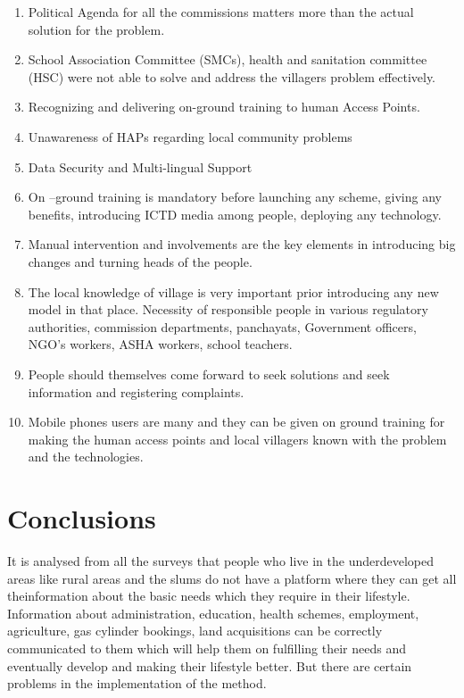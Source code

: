 \begin{enumerate}
\item Political Agenda for all the commissions matters more than the actual solution for the problem.
\item School Association Committee (SMCs), health and sanitation committee (HSC) were not able to solve and address the villagers problem effectively.
\item Recognizing and delivering on-ground training to human Access Points.
\item Unawareness of HAPs regarding local community problems
\item Data Security and Multi-lingual Support
\item On –ground training is mandatory before launching any scheme, giving any
benefits, introducing ICTD media among people, deploying any technology.
\item Manual intervention and involvements are the key elements in introducing
big changes and turning heads of the people.
\item The local knowledge of village is very important prior introducing any new
model in that place.
Necessity of responsible people in various regulatory authorities, commission
departments, panchayats, Government officers, NGO’s workers, ASHA
workers, school teachers.
\item People should themselves come forward to seek solutions and seek
information and registering complaints.
\item Mobile phones users are many and they can be given on ground training for
making the human access points and local villagers known with the problem
and the technologies.
\end{enumerate}

\section {Conclusions}
It is analysed from all the surveys that people who live in the underdeveloped areas
like rural areas and the slums do not have a platform where they can get all theinformation about the basic needs which they require in their lifestyle. Information
about administration, education, health schemes, employment, agriculture, gas
cylinder bookings, land acquisitions can be correctly communicated to them which
will help them on fulfilling their needs and eventually develop and making their
lifestyle better. But there are certain problems in the implementation of the
method.

